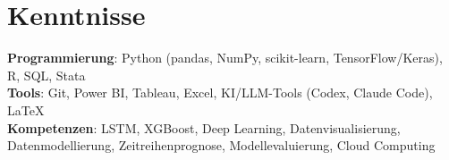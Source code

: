 \section{Kenntnisse}
    \begin{itemize}[leftmargin=0in, label={}]
	\small{\item{\strut
		\textbf{Programmierung}{: Python (pandas, NumPy, scikit-learn, TensorFlow/Keras), R, SQL, Stata} \\
		\textbf{Tools}{: Git, Power BI, Tableau, Excel, KI/LLM-Tools (Codex, Claude Code), LaTeX} \\
		\textbf{Kompetenzen}{: LSTM, XGBoost, Deep Learning, Datenvisualisierung, Datenmodellierung, Zeitreihenprognose, Modellevaluierung, Cloud Computing} \\
		
	}}
    \end{itemize}
